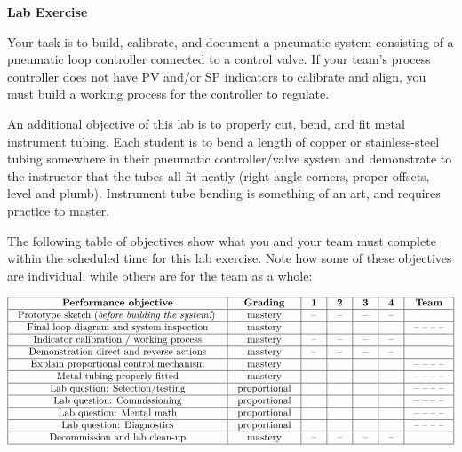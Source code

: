 

\noindent
{\bf Lab Exercise}

\vskip 5pt

Your task is to build, calibrate, and document a pneumatic system consisting of a pneumatic loop controller connected to a control valve.  If your team's process controller does not have PV and/or SP indicators to calibrate and align, you must build a working process for the controller to regulate.

An additional objective of this lab is to properly cut, bend, and fit metal instrument tubing.  Each student is to bend a length of copper or stainless-steel tubing somewhere in their pneumatic controller/valve system and demonstrate to the instructor that the tubes all fit neatly (right-angle corners, proper offsets, level and plumb).  Instrument tube bending is something of an art, and requires practice to master.

The following table of objectives show what you and your team must complete within the scheduled time for this lab exercise.  Note how some of these objectives are individual, while others are for the team as a whole:



$$\vbox{\offinterlineskip
\halign{\strut
\vrule \quad\hfil # \ \hfil & 
\vrule \quad\hfil # \ \hfil & 
\vrule \quad\hfil # \ \hfil & 
\vrule \quad\hfil # \ \hfil & 
\vrule \quad\hfil # \ \hfil & 
\vrule \quad\hfil # \ \hfil & 
\vrule \quad\hfil # \ \hfil \vrule \cr
\noalign{\hrule}
%
{\bf Performance objective} & {\bf Grading} & {\bf 1} & {\bf 2} & {\bf 3} & {\bf 4} & {\bf Team} \cr
%
\noalign{\hrule}
%
Prototype sketch ({\it before building the system!}) & mastery & -- & -- & -- & -- & \cr
%
\noalign{\hrule}
%
Final loop diagram and system inspection & mastery & & & & & -- -- -- -- \cr
%
\noalign{\hrule}
%
Indicator calibration / working process & mastery & -- & -- & -- & -- &  \cr
%
\noalign{\hrule}
%
Demonstration direct and reverse actions & mastery & -- & -- & -- & -- &  \cr
%
\noalign{\hrule}
%
Explain proportional control mechanism & mastery & & & & & -- -- -- -- \cr
%
\noalign{\hrule}
%
Metal tubing properly fitted & mastery & & & & & -- -- -- -- \cr
%
\noalign{\hrule}
%
Lab question: Selection/testing & proportional &  &  &  &  & -- -- -- -- \cr
%
\noalign{\hrule}
%
Lab question: Commissioning & proportional &  &  &  &  & -- -- -- -- \cr
%
\noalign{\hrule}
%
Lab question: Mental math & proportional &  &  &  &  & -- -- -- -- \cr
%
\noalign{\hrule}
%
Lab question: Diagnostics & proportional &  &  &  &  & -- -- -- -- \cr
%
\noalign{\hrule}
%
Decommission and lab clean-up & mastery & -- & -- & -- & -- &  \cr
%
\noalign{\hrule}
} %
}$$ %

